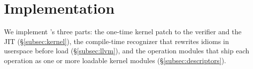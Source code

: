 







\section{Implementation}
\label{sec:implementation}

We implement \tool's three parts: the one-time kernel patch to the verifier and the JIT (\S\ref{subsec:kernel}), the compile-time recognizer that rewrites idioms in userspace before load (\S\ref{subsec:llvm}), and the operation modules that ship each \lang operation as one or more loadable kernel modules (\S\ref{subsec:descriptors}).


